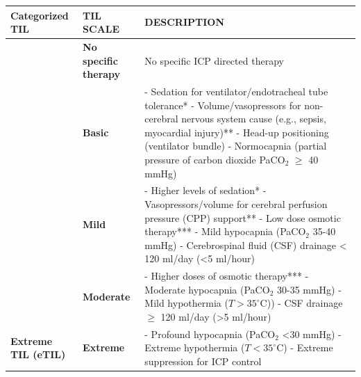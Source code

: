 \begin{table}[h!]
    \centering
    \renewcommand{\arraystretch}{1.5} %
    \begin{adjustbox}{width=0.8\textwidth}
    \begin{tabular}{|>{\raggedright\arraybackslash}p{4cm}|>{\raggedright\arraybackslash}p{4cm}|>{\raggedright\arraybackslash}p{10cm}|}
        \hline
        \textbf{Categorized TIL} & \textbf{TIL SCALE} & \textbf{DESCRIPTION} \\
        \hline
        \multirow{2}{*}{\textbf{TIL 1}} 
        & \textbf{No specific therapy} & No specific ICP directed therapy \\
        \cline{2-3}
        & \textbf{Basic} 
        & - Sedation for ventilator/endotracheal tube tolerance* \newline 
        - Volume/vasopressors for non-cerebral nervous system cause (e.g., sepsis, myocardial injury)** \newline 
        - Head-up positioning (ventilator bundle) \newline 
        - Normocapnia (partial pressure of carbon dioxide PaCO$_2$ $\geq$ 40 mmHg) \\
        \hline
        \multirow{2}{*}{\textbf{TIL 2-3}} 
        & \textbf{Mild} 
        & - Higher levels of sedation* \newline 
        - Vasopressors/volume for cerebral perfusion pressure (CPP) support** \newline 
        - Low dose osmotic therapy*** \newline 
        - Mild hypocapnia (PaCO$_2$ 35-40 mmHg) \newline 
        - Cerebrospinal fluid (CSF) drainage < 120 ml/day (<5 ml/hour) \\
        \cline{2-3}
        & \textbf{Moderate} 
        & - Higher doses of osmotic therapy*** \newline 
        - Moderate hypocapnia (PaCO$_2$ 30-35 mmHg) \newline 
        - Mild hypothermia ($T>35^\circ\text{C}$)) \newline 
        - CSF drainage $\geq$ 120 ml/day (>5 ml/hour) \\
        \hline
        \textbf{Extreme TIL (eTIL)} 
        & \textbf{Extreme} 
        & - Profound hypocapnia (PaCO$_2$ <30 mmHg) \newline 
        - Extreme hypothermia ($T<35^\circ\text{C}$) \newline 
        - Extreme suppression for ICP control \newline 

\end{tabular}
\end{adjustbox}
\end{table}
